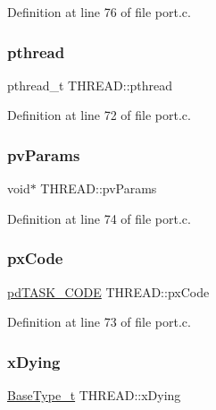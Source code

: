Definition at line 76 of file port.\+c.

\mbox{\label{struct_t_h_r_e_a_d_a50e8589a10aced2217d78908c8f3c872}} 
\subsubsection{\texorpdfstring{pthread}{pthread}}
{\footnotesize\ttfamily pthread\+\_\+t T\+H\+R\+E\+A\+D\+::pthread}



Definition at line 72 of file port.\+c.

\mbox{\label{struct_t_h_r_e_a_d_add6711bad712097bc2f5902fe4b15fa0}} 
\subsubsection{\texorpdfstring{pv\+Params}{pvParams}}
{\footnotesize\ttfamily void$\ast$ T\+H\+R\+E\+A\+D\+::pv\+Params}



Definition at line 74 of file port.\+c.

\mbox{\label{struct_t_h_r_e_a_d_aef06542fdf89760a1fd3485aea297935}} 
\subsubsection{\texorpdfstring{px\+Code}{pxCode}}
{\footnotesize\ttfamily \hyperlink{vendor_2ceedling_2plugins_2freertos_2vendor_2freertos_2include_2_free_r_t_o_s_8h_a74cee96c96792dab96bdc57ba9007b24}{pd\+T\+A\+S\+K\+\_\+\+C\+O\+DE} T\+H\+R\+E\+A\+D\+::px\+Code}



Definition at line 73 of file port.\+c.

\mbox{\label{struct_t_h_r_e_a_d_ade881e6e1d6e6671ae9563520e865426}} 
\subsubsection{\texorpdfstring{x\+Dying}{xDying}}
{\footnotesize\ttfamily \hyperlink{externals_2freertos_2portable_2_g_c_c_2_a_r_m___c_m0_2portmacro_8h_a46fb21e00ae0729d7515c0fbf2269796}{Base\+Type\+\_\+t} T\+H\+R\+E\+A\+D\+::x\+Dying}



